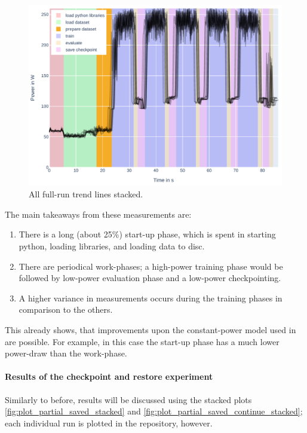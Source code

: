 \begin{figure}
    \includegraphics[width=\linewidth]{power-measurements/stacked_plots/roberta_full_0714.pdf}
    \caption{All full-run trend lines stacked. }
    \label{fig:plot_full_stacked}
\end{figure}

The main takeaways from these measurements are:

\begin{enumerate}
    \item There is a long (about 25\%) start-up phase, which is spent in starting python, loading libraries, and loading data to disc.
    \item There are periodical work-phases; a high-power training phase would be followed by low-power evaluation phase and a low-power checkpointing.
    \item A higher variance in measurements occurs during the training phases in comparison to the others.
\end{enumerate}

This already shows, that improvements upon the constant-power model used in \cite{wiesner_lets_2021} are possible. 
For example, in this case the start-up phase has a much lower power-draw than the work-phase.

\paragraph{Results of the checkpoint and restore experiment}

Similarly to before, results will be discussed using the stacked plots \ref{fig:plot_partial_saved_stacked} and \ref{fig:plot_partial_saved_continue_stacked}; each individual run is plotted in the repository, however.


